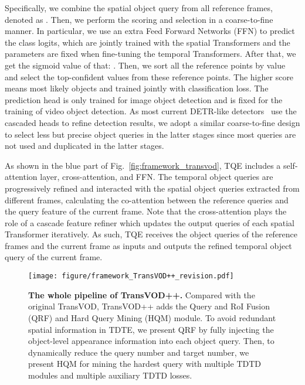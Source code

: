 \documentclass[10pt,journal,compsoc]{IEEEtran}
\begin{document}
Specifically, we combine the spatial object query from all reference frames, denoted as . Then, we perform the scoring and selection in a coarse-to-fine manner. In particular, we use an extra Feed Forward Networks (FFN) to predict the class logits, which are jointly trained with the spatial Transformers and the parameters are fixed when fine-tuning the temporal Transformers.
After that, we get the sigmoid value of that: . Then, we sort all the reference points by  value and select the top-confident  values from these reference points. The higher  score means most likely objects and trained jointly with classification loss. The prediction head is only  trained for image object detection and is fixed for the training of video object detection. As most current DETR-like detectors~\cite{detr,zhu2020deformable} use the cascaded heads to refine detection results, we adopt a similar coarse-to-fine design to select less but precise object queries in the latter stages since most queries are not used and duplicated in the latter stages.


As shown in the blue part of Fig.~\ref{fig:framework_transvod}, TQE includes a self-attention layer, cross-attention, and FFN.
The temporal object queries are progressively refined and interacted with the spatial object queries extracted from different frames, calculating the co-attention between the reference queries and the query feature of the current frame. Note that the cross-attention plays the role of a cascade feature refiner which updates the output queries of each spatial Transformer iteratively. As such, TQE receives the object queries of the reference frames and the current frame as inputs and outputs the refined temporal object query of the current frame.

\begin{figure*}[h]
    \centering
    \texttt{[image: figure/framework\_TransVOD++\_revision.pdf]}
    \caption{\small \textbf{The whole pipeline of TransVOD++.} Compared with the original TransVOD, TransVOD++ adds the Query and RoI Fusion (QRF) and Hard Query Mining (HQM) module. To avoid redundant spatial information in TDTE, we present QRF by fully injecting the object-level appearance information into each object query. Then, to dynamically reduce the query number and target number, we present HQM for mining the hardest query with multiple TDTD modules and multiple auxiliary TDTD losses. }
    \label{fig:framework_transvod_plus}
    \vspace{-5mm}
\end{figure*}
\end{document}

